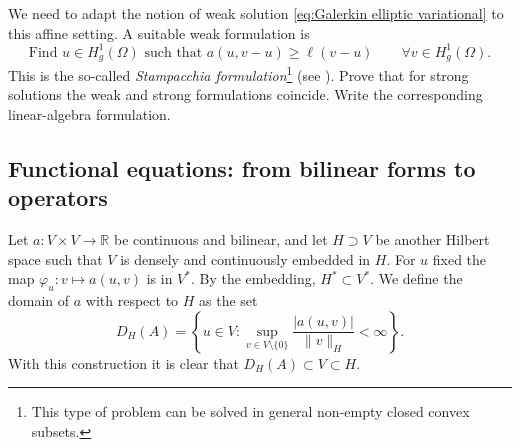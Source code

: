 \begin{exercises}
We need to adapt the notion of weak solution \eqref{eq:Galerkin elliptic variational} to this affine setting.
A suitable weak formulation is
\begin{equation*}
    \text{Find }u \in H^1_g(\Omega) \text{ such that } a(u, v-u) \ge \ell(v - u) \qquad \forall v \in H^1_g(\Omega).
\end{equation*}
This is the so-called \emph{Stampacchia formulation}\footnote{This type of problem can be solved in general non-empty closed convex subsets.} (see \cite[Section 5.3]{Brezis2010}).
Prove that for strong solutions the weak and strong formulations coincide.
Write the corresponding linear-algebra formulation.
\end{exercises}

\subsection{Functional equations: from bilinear forms to operators}
Let $a: V \times V \to \mathbb R$ be continuous and bilinear, and let $H \supset V$ be another Hilbert space such that $V$ is densely and continuously embedded in $H$.
For $u$ fixed the map $\varphi_u : v \mapsto a(u,v)$ is in $V^*$.
By the embedding, $H^* \subset V^*$. We define the domain of $a$ with respect to $H$ as the set
\begin{equation*}
    D_H(A) = \left\{ u \in V : \sup_{v \in V \setminus \{0\}} \frac{|a(u,v)|}{\|v\|_H} < \infty  \right\}.
\end{equation*}
With this construction it is clear that $D_H(A) \subset V \subset H$.

